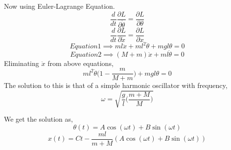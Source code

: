 \documentclass{article}
\begin{document}
	 	Now using Euler-Lagrange Equation.
	 \begin{equation*}
	 	\frac{d}{dt}\frac{\partial L } {\partial \dot{\theta} } = \frac{\partial L}{\partial \theta} \tag{1}
	 \end{equation*}
	 \begin{equation*}
	 	\frac{d}{dt}\frac{\partial L } {\partial \dot{x} } = \frac{\partial L}{\partial x} \tag{2}
	 \end{equation*}
	 \begin{equation*}
	 	Equation 1 \implies ml\ddot{x}+ml^2\ddot{\theta}+mgl\theta=0	\tag{a}
	 \end{equation*}
	 \begin{equation*}
	 	Equation 2 \implies (M+m)\ddot{x}+ml\ddot{\theta}	= 0 \tag{b}
	 \end{equation*}
 Eliminating $ \ddot{x} $ from above equations,
 	 \begin{equation*}
		ml^2\ddot{\theta}\biggr(1-\frac{m}{M+m}\biggr) + mgl\theta =0 	
     \end{equation*}
 The solution to this is that of a simple harmonic oscillator with frequency,
 \[ \omega = \sqrt{\frac{g}{l}\biggr(\frac{m+M}{M}\biggr)} \]
 
 We get the solution as,
 \[ \theta(t) = A \cos(\omega t) + B \sin(\omega t) \]
 \[ x(t) = Ct - \frac{ml}{m+M}(A \cos(\omega t) + B\sin(\omega t)) \]
 \newpage
\end{document}

